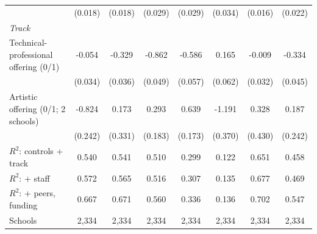 \begin{tabular}{lccccccc}
 & (0.018) & (0.018) & (0.029) & (0.029) & (0.034) & (0.016) & (0.022) \\
\multicolumn{8}{l}{\textit{Track}} \\
\quad Technical-professional offering (0/1) & -0.054 & -0.329 & -0.862 & -0.586 & 0.165 & -0.009 & -0.334 \\
 & (0.034) & (0.036) & (0.049) & (0.057) & (0.062) & (0.032) & (0.045) \\
\quad Artistic offering (0/1; 2 schools) & -0.824 & 0.173 & 0.293 & 0.639 & -1.191 & 0.328 & 0.187 \\
 & (0.242) & (0.331) & (0.183) & (0.173) & (0.370) & (0.430) & (0.242) \\
\midrule
$R^2$: controls + track & 0.540 & 0.541 & 0.510 & 0.299 & 0.122 & 0.651 & 0.458 \\
$R^2$: + staff & 0.572 & 0.565 & 0.516 & 0.307 & 0.135 & 0.677 & 0.469 \\
$R^2$: + peers, funding & 0.667 & 0.671 & 0.560 & 0.336 & 0.136 & 0.702 & 0.547 \\
Schools & 2,334 & 2,334 & 2,334 & 2,334 & 2,334 & 2,334 & 2,334 \\
\bottomrule
\end{tabular}

